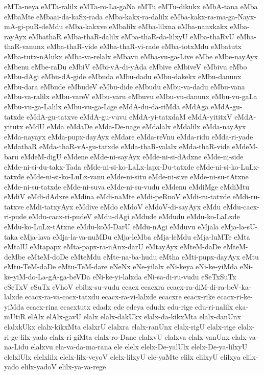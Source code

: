 {eMTa-neya
eMTa-ralilx
eMTa-ro-La-gaNa
eMTu
eMTu-dikukx
eMbA-tana
eMba
eMbaMte
eMbaai-da-kaSx-rada
eMba-kakx-ra-dalilx
eMba-kakx-ra-ma-ga-Nayx-mA-gi-puR-deMdu
eMba-kakxve
eMbalilx
eMba-lilxna
eMba-nanxkakx
eMba-rayAyx
eMbathaR
eMba-thaR-dalilx
eMba-thaR-da-lilxyU
eMba-thaRvU
eMba-thaR-vanunx
eMba-thaR-vide
eMba-thaR-vi-rade
eMba-totxMdu
eMbatutx
eMba-tutx-nAlukx
eMba-va-relalx
eMbavu
eMba-vu-ga-Live
eMbe
eMbe-nayAyx
eMbenu
eMbe-raDu
eMbiV
eMbi-vA-di-yAda
eMbive
eMbiveV
eMbivu
eMbo
eMbu-dAgi
eMbu-dA-gide
eMbuda
eMbu-dadu
eMbu-dakekx
eMbu-danunx
eMbu-dara
eMbude
eMbudeV
eMbu-dide
eMbudu
eMbu-va-dadu
eMbu-vana
eMbu-va-ralilx
eMbu-vareV
eMbu-varu
eMbuvu
eMbu-vu-danunx
eMbu-vu-gaLa
eMbu-vu-ga-Lalilx
eMbu-vu-ga-Lige
eMdA-du-da-riMda
eMdAga
eMdA-gu-tatxde
eMdA-gu-tatxve
eMdA-gu-vuvu
eMdA-yi-tatxdaM
eMdA-yititxV
eMdA-yitutx
eMdU
eMda
eMdaDe
eMda-De-nage
eMdalalx
eMdalilx
eMda-nayAyx
eMda-nayayx
eMda-pupx-dayAyx
eMdare
eMda-reVnu
eMda-ridu
eMda-ri-yade
eMdathaR
eMda-thaR-vA-gu-tatxde
eMda-thaR-valalx
eMda-thaR-vide
eMdeM-baru
eMdeM-digU
eMdene
eMde-ni-sayAyx
eMde-ni-si-dAdxne
eMde-ni-side
eMde-ni-si-du-takx-Tada
eMde-ni-si-ko-LaLx-lapx-Du-tatxde
eMde-ni-si-ko-LuLx-tatxde
eMde-ni-si-ko-LuLx-vanu
eMde-ni-situ
eMde-ni-sive
eMde-ni-su-tAtxne
eMde-ni-su-tatxde
eMde-ni-suva
eMde-ni-su-vudu
eMdenu
eMdiMge
eMdiMtu
eMdiV
eMdi-dAdxre
eMdina
eMdi-naMte
eMdi-peRnoV
eMdi-ru-tatxde
eMdi-ru-tatxve
eMdi-tatxyAyx
eMdive
eMdo
eMdoV
eMdoV-di-sayAyx
eMdu
eMdu-cacx-ri-pude
eMdu-cacx-ri-pudeV
eMdu-dAgi
eMdude
eMdudu
eMdu-ko-LaLxde
eMdu-ko-LuLx-tAtxne
eMdu-koM-DarU
eMdu-nAgi
eMduvu
eMjala
eMja-la-sU-taka
eMja-lava
eMja-la-va-nuMDu
eMja-leMba
eMja-leMdu
eMja-luMTe
eMta
eMtalU
eMtapapx
eMta-papx-ra-nAnx-darU
eMtayAyx
eMteM-daDe
eMteM-deMbe
eMteM-doDe
eMteMdu
eMte-na-ba-hudu
eMtha
eMti-pupx-dayAyx
eMtu
eMtu-TeM-daDe
eMtu-TeM-dare
eNeNx
eNe-yilalx
eNi-keya
eNi-ke-yiMda
eNi-ke-yiM-do-La-gA-ga-beVDa
eNi-ke-yi-lalxda
eNi-sa-di-ru-vudu
eSeTxSuTx
eSeTxV
eSuTx
eVhoV
ebibx-su-vudu
ecacx
ecacxra
ecacx-ra-diM-di-ra-beV-ka-lalxde
ecacx-ra-va-cocx-tatxdu
ecacx-ra-vi-lalxde
ecacxre
ecacx-rike
ecacx-ri-ke-yiMda
ecacx-rina
ecacxtutx
edadx
ede
edeya
edudx
edu-rige
edu-ri-nalilx
eka-mUtiR
elAlx
elAlx-gavU
elalx
elalx-dakUkx
elalx-da-kikxMta
elalx-danUnx
elalxkUkx
elalx-kikxMta
elalxrU
elalxra
elalx-ranUnx
elalx-rigU
elalx-rige
elalx-ri-ge-lilx-yado
elalx-ri-giMta
elalx-ro-Dane
elalxvU
elalxva
elalx-vanUnx
elalx-va-na-Lidu
elalxvu
ela-va-da-ma-rana
ele
elelx
elelx-De-yalUlx
elelx-De-ya-lilxyU
elelxlUlx
elelxlilx
elelx-lilx-veyoV
elelx-lilxyU
ele-yaMte
elilx
elilxyU
elilxya
elilx-yado
elilx-yadoV
elilx-ya-va-rege
}
